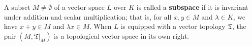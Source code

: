 A subset $M \neq \emptyset$ of a vector space $L$ over $K$ is called a \textbf{subspace} if it is invariant under addition and scalar multiplication; that is, for all $x, y \in M$ and $\lambda \in K$, we have $x + y \in M$ and $\lambda x \in M$. When $L$ is equipped with a vector topology $\mathfrak{T}$, the pair $(M, \mathfrak{T}|_M)$ is a topological vector space in its own right.
